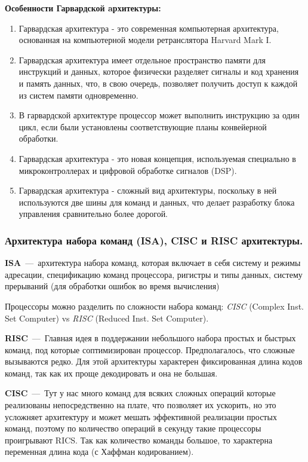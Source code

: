\documentclass{article}
\begin{document}
\textbf{Особенности Гарвардской aрхитектуры:}
\begin{enumerate}
	\item Гарвардская архитектура - это современная компьютерная архитектура, основанная на компьютерной модели ретранслятора Harvard Mark I.
	\item Гарвардская архитектура имеет отдельное пространство памяти для инструкций и данных, которое физически разделяет сигналы и код хранения и память данных, что, в свою очередь, позволяет получить доступ к каждой из систем памяти одновременно.
	\item В гарвардской архитектуре процессор может выполнить инструкцию за один цикл, если были установлены соответствующие планы конвейерной обработки.
	\item Гарвардская архитектура - это новая концепция, используемая специально в микроконтроллерах и цифровой обработке сигналов (DSP).
	\item Гарвардская архитектура - сложный вид архитектуры, поскольку в ней используются две шины для команд и данных, что делает разработку блока управления сравнительно более дорогой.
\end{enumerate}

\subsubsection{Архитектура набора команд (ISA), CISC и RISC архитектуры.}

\textbf{ISA}~---~архитектура набора команд, которая включает в себя систему и режимы адресации, спецификацию команд процессора, ригистры и типы данных, систему прерываний (для обработки ошибок во время вычисления)

Процессоры можно разделить по сложности набора команд:
\emph{CISC} (Complex Inst. Set Computer) vs \emph{RISC} (Reduced Inst. Set Computer).

\textbf{RISC}~---~Главная идея в поддержании небольшого набора простых и быстрых команд, под которые соптимизирован процессор. Предполагалось, что  сложные вызываются редко. Для этой архитектуры характерен фиксированная длина кодов команд, так как их проще декодировать и она не большая.

\textbf{CISC}~---~Тут у нас много команд для всяких сложных операций которые реализованы непосредственно на плате, что позволяет их ускорить, но это усложняет архитектуру и может мешать эффективной реализации простых команд, поэтому по количество операций в секунду такие процессоры проигрывают RICS. Так как количество команды большое, то характерна переменная длина кода (с Хаффман кодированием).
\end{document}
